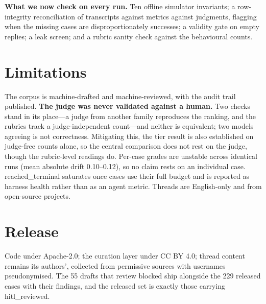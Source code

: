 \documentclass{article}
\newcommand{\fix}[1]{\textsf{#1}}
\begin{document}
\textbf{What we now check on every run.} Ten offline simulator
invariants; a row-integrity reconciliation of transcripts against metrics
against judgments, flagging when the missing cases are disproportionately
successes; a validity gate on empty replies; a leak screen; and a rubric
sanity check against the behavioural counts.

\section{Limitations}

The corpus is machine-drafted and machine-reviewed, with the audit trail
published. \textbf{The judge was never validated against a human.} Two
checks stand in its place---a judge from another family reproduces the
ranking, and the rubrics track a judge-independent count---and neither is
equivalent; two models agreeing is not correctness. Mitigating this, the
tier result is also established on judge-free counts alone, so the
central comparison does not rest on the judge, though the rubric-level
readings do. Per-case grades are unstable across identical runs (mean
absolute drift 0.10--0.12), so no claim rests on an individual case.
\fix{reached\_terminal} saturates once cases use their full budget and is
reported as harness health rather than as an agent metric. Threads are
English-only and from open-source projects.

\section{Release}

Code under Apache-2.0; the curation layer under CC BY 4.0; thread content
remains its authors', collected from permissive sources with usernames
pseudonymised. The 55 drafts that review blocked ship alongside the 229
released cases with their findings, and the released set is exactly those
carrying \fix{hitl\_reviewed}.
\end{document}
